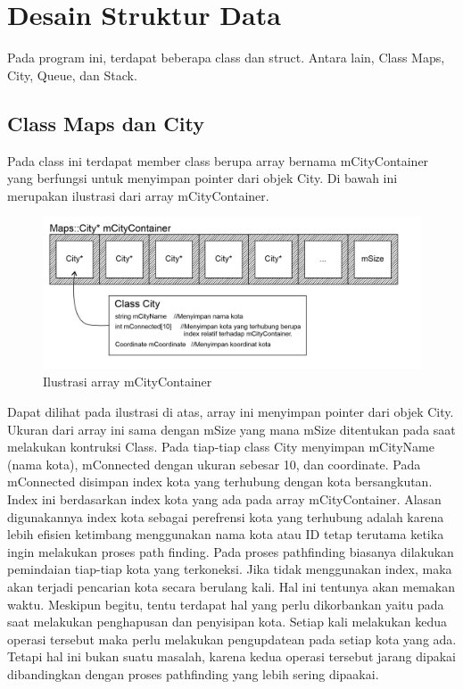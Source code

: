 \documentclass[]{article}
\begin{document}
\section{Desain Struktur Data}
\par
Pada program ini, terdapat beberapa class dan struct. Antara lain, Class Maps, City, Queue, dan Stack.
\subsection{Class Maps dan City}
\par
Pada class ini terdapat member class berupa array bernama mCityContainer yang berfungsi untuk menyimpan pointer dari objek City. Di bawah ini merupakan
ilustrasi dari array mCityContainer.
\begin{figure}[htp]
    \centering
    \includegraphics[width=12cm]{mCityContainer.png}
    \caption{Ilustrasi array mCityContainer}
    \label{fig:maps}
\end{figure}
\par
Dapat dilihat pada ilustrasi di atas, array ini menyimpan pointer dari objek City. Ukuran dari array ini sama dengan mSize yang mana mSize ditentukan pada saat melakukan kontruksi Class. Pada tiap-tiap class City
menyimpan mCityName (nama kota), mConnected dengan ukuran sebesar 10, dan coordinate. Pada mConnected disimpan index kota yang terhubung dengan kota bersangkutan. Index ini berdasarkan index kota yang ada pada array mCityContainer.
Alasan digunakannya index kota sebagai perefrensi kota yang terhubung adalah karena lebih efisien ketimbang menggunakan nama kota atau ID tetap terutama ketika ingin melakukan proses
path finding. Pada proses pathfinding biasanya dilakukan pemindaian tiap-tiap kota yang terkoneksi. Jika tidak menggunakan index, maka akan terjadi pencarian kota secara berulang kali. Hal ini tentunya akan memakan waktu. Meskipun begitu,
tentu terdapat hal yang perlu dikorbankan yaitu pada saat melakukan penghapusan dan penyisipan kota. Setiap kali melakukan kedua operasi tersebut maka perlu melakukan pengupdatean pada setiap kota yang ada. Tetapi hal ini bukan suatu masalah,
karena kedua operasi tersebut jarang dipakai dibandingkan dengan proses pathfinding yang lebih sering dipaakai.
\end{document}
